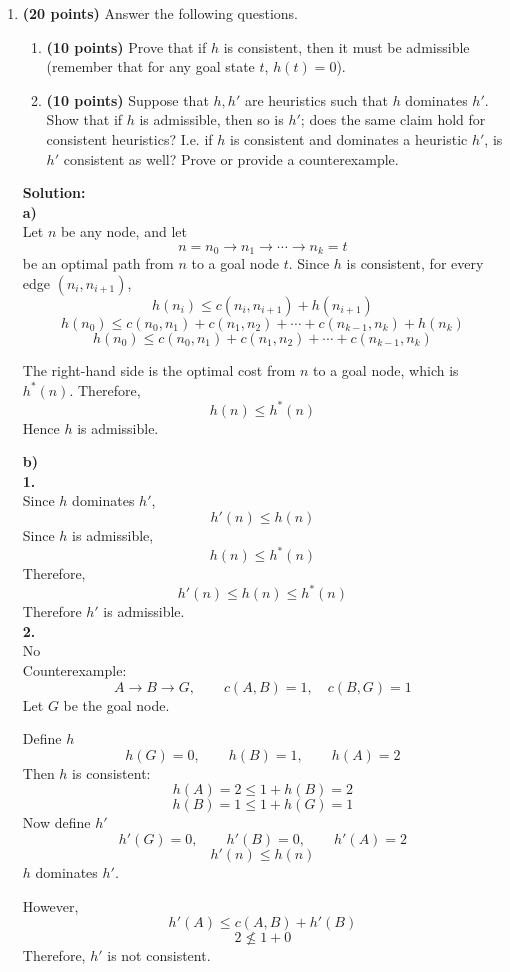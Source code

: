 \documentclass[11pt]{article}
\begin{document}
\begin{enumerate}[label=\textbf{\arabic*.}, leftmargin=*]
    \newpage

    \item \textbf{(20 points)} Answer the following questions.
    \begin{enumerate}[label=(\alph*)]
        \item \textbf{(10 points)} Prove that if $h$ is consistent, then it must be admissible (remember that for any goal state $t$, $h(t) = 0$).
        \item \textbf{(10 points)} Suppose that $h,h'$ are heuristics such that $h$ dominates $h'$. Show that if $h$ is admissible, then so is $h'$; does the same claim hold for consistent heuristics? I.e. if $h$ is consistent and dominates a heuristic $h'$, is $h'$ consistent as well? Prove or provide a counterexample.
    \end{enumerate}
    \textbf{Solution:}\\
\textbf{a)}\\
Let \(n\) be any node, and let
\[
n = n_0 \to n_1 \to \cdots \to n_k = t
\]
be an optimal path from \(n\) to a goal node \(t\). Since \(h\) is consistent, for every edge \((n_i, n_{i+1})\),
\[h(n_i) \le c(n_i, n_{i+1}) + h(n_{i+1})\]
\[h(n_0) \le c(n_0, n_1) + c(n_1, n_2) + \cdots + c(n_{k-1}, n_k) + h(n_k)\]
\[h(n_0) \le c(n_0, n_1) + c(n_1, n_2) + \cdots + c(n_{k-1}, n_k)\]

The right-hand side is the optimal cost from \(n\) to a goal node, which is \(h^*(n)\). Therefore,
\[
h(n) \le h^*(n)
\]
Hence \(h\) is admissible.

\textbf{b)}\\
\textbf{1.}\\
Since \(h\) dominates \(h'\),
\[
h'(n) \le h(n)
\]
Since \(h\) is admissible,
\[
h(n) \le h^*(n)
\]
Therefore,
\[
h'(n) \le h(n) \le h^*(n)
\]
Therefore \(h'\) is admissible.\\

\textbf{2.}\\
No\\
Counterexample:\\
\[
A \to B \to G, 
\qquad c(A,B)=1,\quad c(B,G)=1
\]
Let \(G\) be the goal node.

Define $h$
\[
h(G)=0,\qquad h(B)=1,\qquad h(A)=2
\]
Then \(h\) is consistent:
\[
h(A)=2 \le 1+h(B)=2
\]
\[
h(B)=1 \le 1+h(G)=1
\]
Now define $h'$
\[
h'(G)=0,\qquad h'(B)=0,\qquad h'(A)=2
\]
\[
h'(n)\le h(n)
\]
\(h\) dominates \(h'\).

However,
\[
h'(A)\le c(A,B)+h'(B)
\]
\[
2 \nleq 1+0
\]
Therefore, \(h'\) is not consistent.







\end{enumerate}
\end{document}
